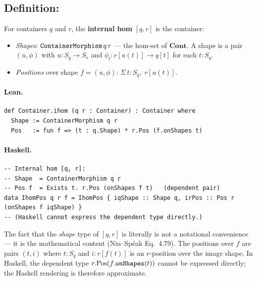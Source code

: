 \documentclass[11pt,a4paper]{article}
\begin{document}
\subsection{Definition: }

\begin{defn}
For containers $q$ and $r$, the \textbf{internal hom} $[q, r]$ is the container:
\begin{itemize}
  \item \emph{Shapes}: $\texttt{ContainerMorphism}\,q\,r$ --- the hom-set of
    $\mathbf{Cont}$.  A shape is a pair $(u, \phi)$ with
    $u : S_q \to S_r$ and $\phi_t : r[u(t)] \to q[t]$ for each $t : S_q$.
  \item \emph{Positions} over shape $f = (u, \phi)$:
    $\Sigma\,t : S_q,\; r[u(t)]$.
\end{itemize}
\end{defn}

\paragraph{Lean.}
\begin{lstlisting}[style=lean]
def Container.ihom (q r : Container) : Container where
  Shape := ContainerMorphism q r
  Pos   := fun f => (t : q.Shape) * r.Pos (f.onShapes t)
\end{lstlisting}

\paragraph{Haskell.}
\begin{lstlisting}[style=haskell]
-- Internal hom [q, r]:
-- Shape  = ContainerMorphism q r
-- Pos f  = Exists t. r.Pos (onShapes f t)   (dependent pair)
data IhomPos q r f = IhomPos { iqShape :: Shape q, irPos :: Pos r (onShapes f iqShape) }
-- (Haskell cannot express the dependent type directly.)
\end{lstlisting}

\begin{fidelitynote}
The fact that the \emph{shape} type of $[q, r]$ is literally  is not a notational convenience --- it is the mathematical content
(Niu--Sp\'{e}ak Eq.~4.79).  The positions over $f$ are pairs $(t, i)$ where
$t : S_q$ and $i : r[f(t)]$ is an $r$-position over the image shape.  In
Haskell, the dependent type $r.\mathrm{Pos}(f.\texttt{onShapes}(t))$ cannot be
expressed directly; the Haskell rendering is therefore approximate.
\end{fidelitynote}
\end{document}
